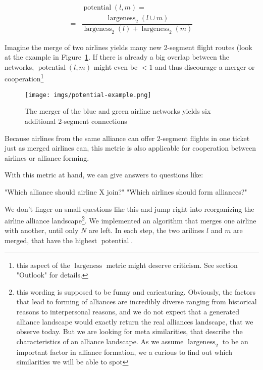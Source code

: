\documentclass[twocolumn]{tum-article}
\DeclareMathOperator{\Largeness}{largeness}
\DeclareMathOperator{\Potential}{potential}
\begin{document}
\begin{equation}
\begin{aligned}
& \Potential(l,m) = \\
= & \dfrac{\Largeness_{2}(l \cup m)}{\Largeness_{2}(l) + \Largeness_{2}(m)} 
\end{aligned}
\end{equation}

Imagine the merge of two airlines yields many new 2-segment flight routes (look at the example in Figure~\ref{fig:potential-example}. If there is already a big overlap between the networks, $\Potential(l,m)$ might even be $< 1$ and thus discourage a merger or cooperation\footnote{this aspect of the $\Largeness$ metric might deserve criticism. See section "Outlook" for details.} 

\begin{figure}
	\centering
	\texttt{[image: imgs/potential-example.png]}
	\caption{
The merger of the blue and green airline networks yields six additional 2-segment connections}
	\label{fig:potential-example}
\end{figure}

Because airlines from the same alliance can offer 2-segment flights in one ticket just as merged airlines can, this metric is also applicable for cooperation between airlines or alliance forming. 


With this metric at hand, we can give answers to questions like: 

"Which alliance should airline X join?"
"Which airlines should form alliances?" 


We don't linger on small questions like this and jump right into reorganizing the airline alliance landscape\footnote{this wording is supposed to be funny and caricaturing. Obviously, the factors that lead to forming of alliances are incredibly diverse ranging from historical reasons to interpersonal reasons, and we do not expect that a generated alliance landscape would exactly return the real alliances landscape, that we observe today. But we are looking for meta similarities, that describe the characteristics of an alliance landscape. As we assume $\Largeness_{2}$ to be an important factor in alliance formation, we a curious to find out which similarities we will be able to spot}. We implemented an algorithm that merges one airline with another, until only $N$ are left. In each step, the two arilines $l$ and $m$ are merged, that have the highest $\Potential$.
\end{document}
